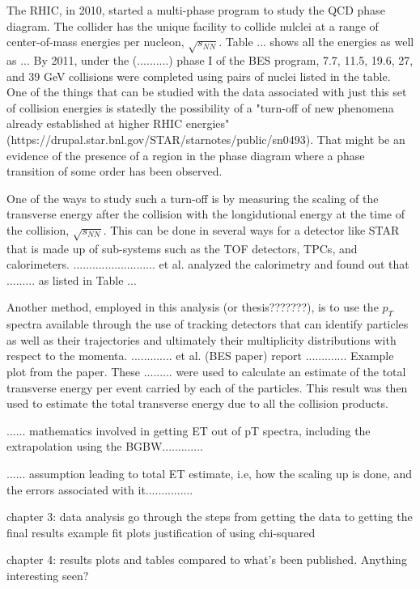 The RHIC, in 2010, started a multi-phase program to study the QCD phase diagram. The collider has the unique facility to collide nulclei at a range of center-of-mass energies per nucleon, $\sqrt{s_{NN}}$. Table ... shows all the energies as well as ... By 2011, under the (..........) phase I of the BES program, 7.7, 11.5, 19.6, 27, and 39 GeV collisions were completed using pairs of nuclei listed in the table. One of the things that can be studied with the data associated with just this set of collision energies is statedly the possibility of a "turn-off of new phenomena already established at higher RHIC energies" (https://drupal.star.bnl.gov/STAR/starnotes/public/sn0493). That might be an evidence of the presence of a region in the phase diagram where a phase transition of some order has been observed.

One of the ways to study such a turn-off is by measuring the scaling of the transverse energy after the collision with the longidutional energy at the time of the collision, $\sqrt{s_{NN}}$. This can be done in several ways for a detector like STAR that is made up of sub-systems such as the TOF detectors, TPCs, and calorimeters. .......................... et al. analyzed the calorimetry and found out that ......... as listed in Table ... 

Another method, employed in this analysis (or thesis???????), is to use the $p_{T}$ spectra available through the use of tracking detectors that can identify particles as well as their trajectories and ultimately their multiplicity distributions with respect to the momenta. ............. et al. (BES paper) report ............. Example plot from the paper. These ......... were used to calculate an estimate of the total transverse energy per event carried by each of the particles. This result was then used to estimate the total transverse energy due to all the collision products. 

...... mathematics involved in getting ET out of pT spectra, including the extrapolation using the BGBW.............

...... assumption leading to total ET estimate, i.e, how the scaling up is done, and the errors associated with it...............

chapter 3: data analysis
go through the steps from getting the data to getting the final results
example fit plots
justification of using chi-squared

chapter 4: results
plots and tables compared to what's been published.
Anything interesting seen?


